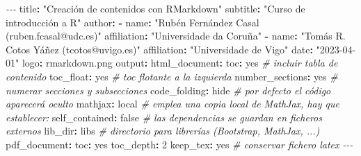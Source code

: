 \documentclass[
]{book}
\newenvironment{Shaded}{\begin{snugshade}}{\end{snugshade}}
\newcommand{\AttributeTok}[1]{\textcolor[rgb]{0.77,0.63,0.00}{#1}}
\newcommand{\CharTok}[1]{\textcolor[rgb]{0.31,0.60,0.02}{#1}}
\newcommand{\CommentTok}[1]{\textcolor[rgb]{0.56,0.35,0.01}{\textit{#1}}}
\newcommand{\DecValTok}[1]{\textcolor[rgb]{0.00,0.00,0.81}{#1}}
\newcommand{\FunctionTok}[1]{\textcolor[rgb]{0.00,0.00,0.00}{#1}}
\newcommand{\KeywordTok}[1]{\textcolor[rgb]{0.13,0.29,0.53}{\textbf{#1}}}
\newcommand{\PreprocessorTok}[1]{\textcolor[rgb]{0.56,0.35,0.01}{\textit{#1}}}
\newcommand{\StringTok}[1]{\textcolor[rgb]{0.31,0.60,0.02}{#1}}
\theoremstyle{break}
\theoremstyle{nonumberplain}
\begin{document}
\begin{Shaded}
\begin{Highlighting}[]
\PreprocessorTok{{-}{-}{-}}
\FunctionTok{title}\KeywordTok{:}\AttributeTok{ }\StringTok{"Creación de contenidos con RMarkdown"}
\FunctionTok{subtitle}\KeywordTok{:}\AttributeTok{ }\StringTok{"Curso de introducción a R"}
\FunctionTok{author}\KeywordTok{:}
\KeywordTok{{-}}\AttributeTok{ }\FunctionTok{name}\KeywordTok{:}\AttributeTok{ }\StringTok{"Rubén Fernández Casal (ruben.fcasal@udc.es)"}
\AttributeTok{  }\FunctionTok{affiliation}\KeywordTok{:}\AttributeTok{ }\StringTok{"Universidade da Coruña"}
\KeywordTok{{-}}\AttributeTok{ }\FunctionTok{name}\KeywordTok{:}\AttributeTok{ }\StringTok{"Tomás R. Cotos Yáñez (tcotos@uvigo.es)"}
\AttributeTok{  }\FunctionTok{affiliation}\KeywordTok{:}\AttributeTok{ }\StringTok{"Universidade de Vigo"}
\FunctionTok{date}\KeywordTok{:}\AttributeTok{ }\StringTok{"2023{-}04{-}01"}
\FunctionTok{logo}\KeywordTok{:}\AttributeTok{ rmarkdown.png}
\FunctionTok{output}\KeywordTok{:}
\AttributeTok{  }\FunctionTok{html\_document}\KeywordTok{:}
\AttributeTok{    }\FunctionTok{toc}\KeywordTok{:}\AttributeTok{ }\CharTok{yes}\CommentTok{                  \# incluir tabla de contenido}
\AttributeTok{    }\FunctionTok{toc\_float}\KeywordTok{:}\AttributeTok{ }\CharTok{yes}\CommentTok{            \# toc flotante a la izquierda}
\AttributeTok{    }\FunctionTok{number\_sections}\KeywordTok{:}\AttributeTok{ }\CharTok{yes}\CommentTok{      \# numerar secciones y subsecciones}
\AttributeTok{    }\FunctionTok{code\_folding}\KeywordTok{:}\AttributeTok{ hide}\CommentTok{        \# por defecto el código aparecerá oculto}
\AttributeTok{    }\FunctionTok{mathjax}\KeywordTok{:}\AttributeTok{ local}\CommentTok{            \# emplea una copia local de MathJax, hay que establecer:}
\AttributeTok{    }\FunctionTok{self\_contained}\KeywordTok{:}\AttributeTok{ }\CharTok{false}\CommentTok{     \# las dependencias se guardan en ficheros externos}
\AttributeTok{    }\FunctionTok{lib\_dir}\KeywordTok{:}\AttributeTok{ libs}\CommentTok{             \# directorio para librerías (Bootstrap, MathJax, ...)}
\AttributeTok{  }\FunctionTok{pdf\_document}\KeywordTok{:}
\AttributeTok{    }\FunctionTok{toc}\KeywordTok{:}\AttributeTok{ }\CharTok{yes}
\AttributeTok{    }\FunctionTok{toc\_depth}\KeywordTok{:}\AttributeTok{ }\DecValTok{2}
\AttributeTok{    }\FunctionTok{keep\_tex}\KeywordTok{:}\AttributeTok{ }\CharTok{yes}\CommentTok{             \# conservar fichero latex}
\PreprocessorTok{{-}{-}{-}}
\end{Highlighting}
\end{Shaded}
\end{document}
